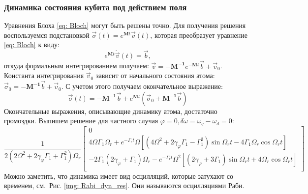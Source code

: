 \subsubsection{Динамика состояния кубита под действием поля}
Уравнения Блоха \eqref{eq: Bloch} могут быть решены точно. Для получения решения воспользуемся подстановкой $\vec{\sigma}(t) = e^{\mathbf{M}t}\vec{v}(t)$, которая преобразует уравнение \eqref{eq: Bloch} к виду:
\begin{equation}
e^{\mathbf{M}t}\dot{\vec{v}}(t) = \vec{b},
\end{equation}откуда формальным интегрированием получаем: $\vec{v} = \mathbf{-M^{-1}}e^{-\mathbf{M}t}\vec{b} + \vec{v}_0$. Константа интегрирования $\vec{v}_0$ зависит от начального состояния атома: $\vec{\sigma}_0 =  -\mathbf{M^{-1}}\vec{b} + \vec{v}_0$. С учетом этого получаем окончательное выражение:
\begin{equation}
\vec{\sigma}(t) = -\mathbf{M^{-1}}\vec{b} + e^{\mathbf{M}t}\left(\vec{\sigma}_0 + \mathbf{M^{-1}}\vec{b}\right)
\end{equation}
Окончательные выражения, описывающие динамику атома, достаточно громоздки. Выпишем решение для частного случая $\varphi=0, \delta\omega=\omega_q - \omega_d = 0$:
\begin{equation}
\textstyle
\frac{1}{2 \left(2\Omega ^2+2 \gamma _{\varphi } \Gamma _1+\Gamma _1^2\right) \Omega _r}
\left[\begin{smallmatrix}
0 \\
4 \Omega  \Gamma _1 \Omega _r+e^{-\Gamma_r t } \Omega \left[  
	\left(4 \Omega ^2+2 \gamma _{\varphi } \Gamma _1-\Gamma _1^2\right)\sin \Omega _rt-4  \Gamma _1 \Omega _r\cos \Omega_rt\right] \\
-2 \Gamma _1 \left(2 \gamma _{\varphi }+\Gamma _1\right) \Omega _r-e^{-\Gamma_r t } \Omega
	^2 \left[\left(2 \gamma _{\varphi }+3 \Gamma _1\right)\sin \Omega _r t +4  \Omega _r \cos \Omega _r t\right] \\ 
\end{smallmatrix}
\right]
\label{eq: dyn_sol}
\end{equation}
Можно заметить, что динамика имеет вид осцилляций, которые затухают со временем, см.~Рис. \ref{img: Rabi_dyn_res}. Они называются осцилляциями Раби. 
